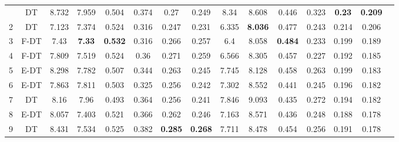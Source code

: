 \begin{longtable}{@{\hskip3pt}c@{\hskip3pt}c@{\hskip3pt}c@{\hskip3pt}c@{\hskip3pt}c@{\hskip3pt}c@{\hskip3pt}c@{\hskip3pt}c@{\hskip3pt}c@{\hskip3pt}c@{\hskip3pt}c@{\hskip3pt}c@{\hskip3pt}c@{\hskip3pt}c@{\hskip3pt}c}
\bottomrule
\endlastfoot
          1\cmidrule(l){3-8} \cmidrule(l){9-14} &             DT &             8.732 &          7.959 &           0.504 &           0.374 &            0.27 &           0.249 &                8.34 &           8.608 &           0.446 &         0.323 &  \textbf{0.23} &  \textbf{0.209} \\
          2 &             DT &             7.123 &          7.374 &           0.524 &           0.316 &           0.247 &           0.231 &               6.335 &  \textbf{8.036} &           0.477 &         0.243 &          0.214 &           0.206 \\
          3 &           F-DT &              7.43 &  \textbf{7.33} &  \textbf{0.532} &           0.316 &           0.266 &           0.257 &                 6.4 &           8.058 &  \textbf{0.484} &         0.233 &          0.199 &           0.189 \\
          4 &           F-DT &             7.809 &          7.519 &           0.524 &            0.36 &           0.271 &           0.259 &               6.566 &           8.305 &           0.457 &         0.227 &          0.192 &           0.185 \\
          5 &           E-DT &             8.298 &          7.782 &           0.507 &           0.344 &           0.263 &           0.245 &               7.745 &           8.128 &           0.458 &         0.263 &          0.199 &           0.183 \\
          6 &           E-DT &             7.863 &          7.811 &           0.503 &           0.325 &           0.256 &           0.242 &               7.302 &           8.552 &           0.441 &         0.245 &          0.196 &           0.182 \\
          7 &             DT &              8.16 &           7.96 &           0.493 &           0.364 &           0.256 &           0.241 &               7.846 &           9.093 &           0.435 &         0.272 &          0.194 &           0.182 \\
          8 &           E-DT &             8.057 &          7.403 &           0.521 &           0.366 &           0.262 &           0.246 &               7.163 &           8.571 &           0.436 &         0.248 &          0.188 &           0.178 \\
          9 &             DT &             8.431 &          7.534 &           0.525 &           0.382 &  \textbf{0.285} &  \textbf{0.268} &               7.711 &           8.478 &           0.454 &         0.256 &          0.191 &           0.178 \\

\end{longtable}

